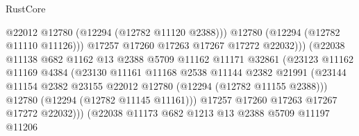 \begin{lexlean}{RustCore}
\begin{coremodule}
                                            @22012
                                            @12780
                                            (@12294 (@12782 @11120 @2388)))
                                          @12780
                                          (@12294 (@12782 @11110 @11126)))
                                        @17257
                                        @17260
                                        @17263
                                        @17267
                                        @17272
                                        @22032)))
                                  (@22038
                                    @11138
                                    @682
                                    @1162
                                    @13
                                    @2388
                                    @5709
                                    @11162
                                    @11171
                                    @32861
                                    (@23123
                                      @11162
                                      @11169
                                      @4384
                                      (@23130
                                        @11161
                                        @11168
                                        @2538
                                        @11144
                                        @2382
                                        @21991
                                        (@23144
                                          @11154
                                          @2382
                                          @23155
                                          @22012
                                          @12780
                                          (@12294 (@12782 @11155 @2388)))
                                        @12780
                                        (@12294 (@12782 @11145 @11161)))
                                      @17257
                                      @17260
                                      @17263
                                      @17267
                                      @17272
                                      @22032)))
                                (@22038
                                  @11173
                                  @682
                                  @1213
                                  @13
                                  @2388
                                  @5709
                                  @11197
                                  @11206

\end{coremodule}
\end{lexlean}
